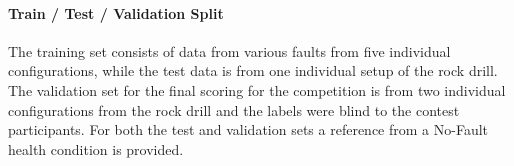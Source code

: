 \paragraph{Train / Test / Validation Split}
The training set consists of data from various faults from five individual configurations, while the test data is from one individual setup of the rock drill. The validation set for the final scoring for the competition is from two individual configurations from the rock drill and the labels were blind to the contest participants. For both the test and validation sets a reference from a No-Fault health condition is provided.







